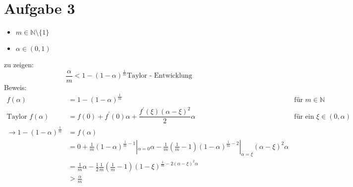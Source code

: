 \documentclass[10pt,a4paper]{article}
\begin{document}
\section*{Aufgabe 3}
\begin{itemize}
	\item \( m \in \mathbb{N} \setminus \{1\} \)
	\item \(\alpha \in (0,1)\)
\end{itemize}
zu zeigen:
\[
	\frac{\alpha}{m} < 1-(1-\alpha)^{\frac{1}{m}} \text{Taylor - Entwicklung}
\]
Beweis:
\begin{align*}
	f(\alpha) &= 1-(1-\alpha)^{\frac{1}{m}} &\text{für } m \in \mathbb{N}\\
	\text{Taylor } f(\alpha) &= f(0) + f^\prime(0) \alpha + 
	\dfrac{f^\prime(\xi) (\alpha - \xi)^2}{2} \alpha &\text{für ein } \xi \in (0,\alpha)\\
	\rightarrow 1-(1-\alpha)^\frac{1}{m}  &= f(\alpha) \\
	&= 0 + \frac{1}{m}(1-\alpha)^{\frac{1}{m}-1} |_{\alpha=0} \alpha - 
	\frac{1}{m} (\frac{1}{m} -1) (1- \alpha)^{\frac{1}{m} - 2} |_{\alpha= \xi} (\alpha - \xi)^2 \alpha \\
	&=\frac{1}{m}\alpha - \frac{1}{2}\frac{1}{m}(\frac{1}{m} -1) (1-\xi)^{\frac{1}{m} - 2 (\alpha-\xi)^2 \alpha}\\
	&> \frac{\alpha}{m}
\end{align*}
\end{document}
